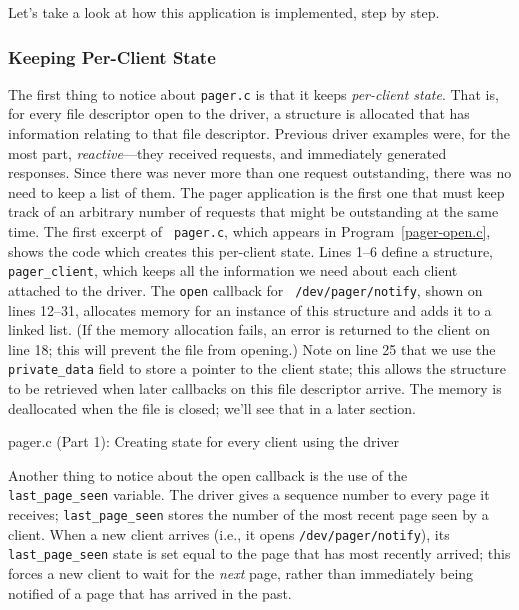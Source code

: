 \documentclass{article}
\begin{document}
Let's take a look at how this application is implemented, step by
step.

\subsubsection{Keeping Per-Client State}

The first thing to notice about {\tt pager.c} is that it keeps {\em
per-client state}.  That is, for every file descriptor open to the
driver, a structure is allocated that has information relating to that
file descriptor.  Previous driver examples were, for the most part,
{\em reactive}---they received requests, and immediately generated
responses.  Since there was never more than one request outstanding,
there was no need to keep a list of them.  The pager application is
the first one that must keep track of an arbitrary number of requests
that might be outstanding at the same time.  The first excerpt of {\tt
pager.c}, which appears in Program~\ref{pager-open.c}, shows the code
which creates this per-client state.  Lines 1--6 define a structure,
{\tt pager\_client}, which keeps all the information we need about
each client attached to the driver.  The {\tt open} callback for {\tt
/dev/pager/notify}, shown on lines 12--31, allocates memory for an
instance of this structure and adds it to a linked list.  (If the
memory allocation fails, an error is returned to the client on line
18; this will prevent the file from opening.)  Note on line 25 that we
use the {\tt private\_data} field to store a pointer to the client
state; this allows the structure to be retrieved when later callbacks
on this file descriptor arrive.  The memory is deallocated when the
file is closed; we'll see that in a later section.

\begin{Program}
\caption{pager.c (Part 1): Creating state for every client using the
driver}
\label{pager-open.c}
\end{Program}

Another thing to notice about the open callback is the use of the {\tt
last\_page\_seen} variable.  The driver gives a sequence number to
every page it receives; {\tt last\_page\_seen} stores the number of
the most recent page seen by a client.  When a new client arrives
(i.e., it opens {\tt /dev/pager/notify}), its {\tt last\_page\_seen}
state is set equal to the page that has most recently arrived; this
forces a new client to wait for the {\em next} page, rather than
immediately being notified of a page that has arrived in the past.
\end{document}
